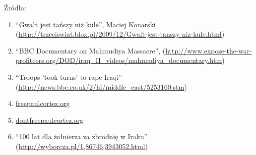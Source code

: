 \documentclass[12pt,a4paper]{article}
\begin{document}
Źródła:
\begin{enumerate}
\item ``Gwałt jest tańszy niż kule'', Maciej Konarski (\url{http://trzeciswiat.blox.pl/2009/12/Gwalt-jest-tanszy-niz-kule.html})
\item ``BBC Documentary on Mahmudiya Massacre'',
  (\url{http://www.expose-the-war-profiteers.org/DOD/iraq_II_videos/mahmudiya_documentary.htm})
\item ``Troops 'took turns' to rape Iraqi'' (\url{http://news.bbc.co.uk/2/hi/middle_east/5253160.stm})
\item \url{freepaulcortez.org}
\item \url{dontfreepaulcortez.org}
\item ``100 lat dla żołnierza za zbrodnię w Iraku'' (\url{http://wyborcza.pl/1,86746,3943052.html})
\end{enumerate}
\end{document}
